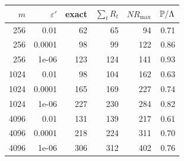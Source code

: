 \begin{tabular}{@{}rrrrrr@{}}
\toprule
$m$ & $\varepsilon'$ & exact & $\sum_t R_t$ & $N R_{\max}$ & $\mathbb{P}/\Lambda$ \\
\midrule
256 & 0.01 & 62 & 65 & 94 & 0.71 \\
256 & 0.0001 & 98 & 99 & 122 & 0.86 \\
256 & 1e-06 & 123 & 124 & 141 & 0.93 \\
1024 & 0.01 & 98 & 104 & 162 & 0.63 \\
1024 & 0.0001 & 165 & 169 & 227 & 0.74 \\
1024 & 1e-06 & 227 & 230 & 284 & 0.82 \\
4096 & 0.01 & 131 & 139 & 217 & 0.61 \\
4096 & 0.0001 & 218 & 224 & 311 & 0.70 \\
4096 & 1e-06 & 306 & 312 & 402 & 0.76 \\
\bottomrule
\end{tabular}

